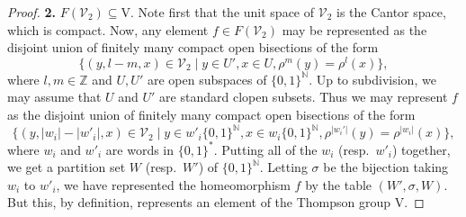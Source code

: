 \documentclass[10pt,a4paper]{amsart}
\numberwithin{equation}{section}
\numberwithin{figure}{section}
\theoremstyle{definition}
\newcommand{\cV}{\mathcal{V}}
\newcommand{\bN}{\mathbb{N}}
\newcommand{\bZ}{\mathbb{Z}}
\newcommand{\V}{\mathrm{V}}
\begin{document}
\begin{proof}
\textbf{2.} $F(\mathcal{V}_2) \subseteq \V$.
Note first that the unit space of $\cV_2$ is the Cantor space, which is compact. Now, any element $f \in F(\mathcal{V}_2)$ may be represented as the disjoint union of finitely many compact open bisections of the form
\[
\{(y,l-m,x) \in \cV_2 \mid y\in U', x\in U,\rho^m(y) = \rho^{l}(x)\},
\]
where $l,m \in \bZ$ and $U,U'$ are open subspaces of $\{0,1\}^{\bN}$. Up to subdivision, we may assume that $U$ and $U'$ are standard clopen subsets. Thus we may represent $f$ as the disjoint union of finitely many compact open bisections of the form
\[
\{(y , \lvert w_i \rvert - \lvert w'_i \rvert , x) \in \cV_2 \mid y\in w'_i\{0,1\}^{\bN}, x\in w_i\{0,1\}^{\bN},\rho^{\lvert w_i' \rvert}(y) = \rho^{\lvert w_i \rvert}(x)\},
\]
where $w_i$ and $w'_i$ are words in $\{0,1\}^{\ast}$. Putting all of the $w_i$ (resp.\ $w'_i$) together, we get a partition set $W$ (resp.\ $W'$) of $\{0,1\}^{\bN}$. Letting $\sigma$ be the bijection taking $w_i$ to $w'_i$, we have represented the homeomorphism $f$ by the table $(W',\sigma,W)$. But this, by definition, represents an element of the Thompson group $\V$.
\end{proof}
\end{document}
